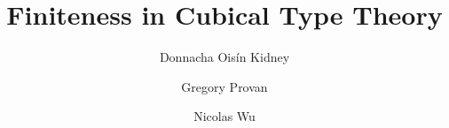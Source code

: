 

\author{
  Donnacha Oisín Kidney \and
  Gregory Provan \and
  Nicolas Wu
}

\title{Finiteness in Cubical Type Theory}





\maketitle













 